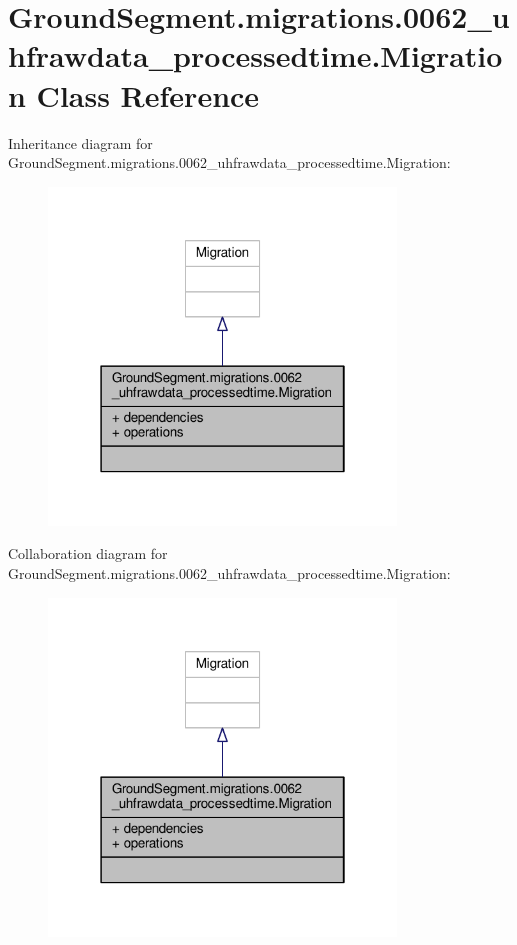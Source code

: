 \hypertarget{class_ground_segment_1_1migrations_1_10062__uhfrawdata__processedtime_1_1_migration}{}\section{Ground\+Segment.\+migrations.0062\+\_\+uhfrawdata\+\_\+processedtime.Migration Class Reference}
\label{class_ground_segment_1_1migrations_1_10062__uhfrawdata__processedtime_1_1_migration}


Inheritance diagram for Ground\+Segment.\+migrations.0062\+\_\+uhfrawdata\+\_\+processedtime.Migration\+:\nopagebreak
\begin{figure}[H]
\begin{center}
\leavevmode
\includegraphics[width=262pt]{class_ground_segment_1_1migrations_1_10062__uhfrawdata__processedtime_1_1_migration__inherit__graph}
\end{center}
\end{figure}


Collaboration diagram for Ground\+Segment.\+migrations.0062\+\_\+uhfrawdata\+\_\+processedtime.Migration\+:\nopagebreak
\begin{figure}[H]
\begin{center}
\leavevmode
\includegraphics[width=262pt]{class_ground_segment_1_1migrations_1_10062__uhfrawdata__processedtime_1_1_migration__coll__graph}
\end{center}
\end{figure}
